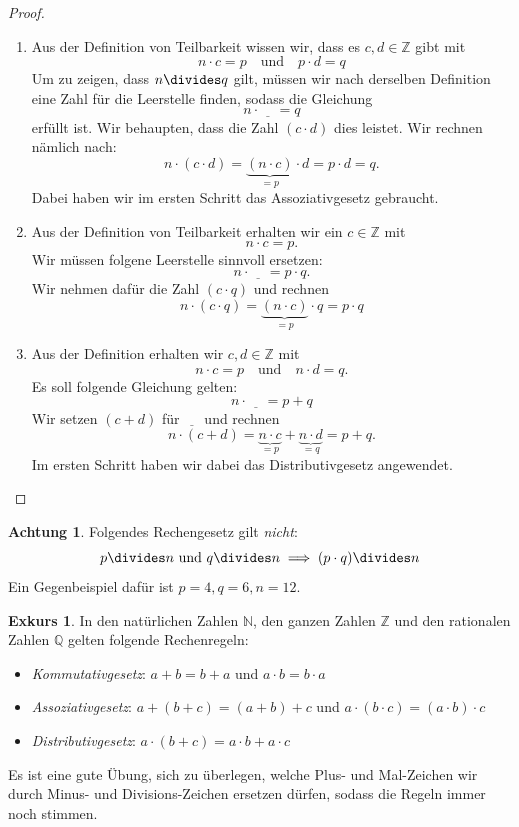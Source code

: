 \documentclass[a4paper,ngerman,12pt]{scrartcl}
\newcommand{\N}{\mathbb{N}}
\newcommand{\Z}{\mathbb{Z}}
\newcommand{\Q}{\mathbb{Q}}
\newcommand{\leer}{\underline{\;\;\;\;}}
\theoremstyle{definition}
\newtheorem*{exk}{Exkurs}
\newtheorem*{acht}{Achtung}
\newenvironment{exkurs}{\begin{shaded}\begin{exk}}{\end{exk}\end{shaded}}
\newenvironment{beweisliste}{\begin{enumerate}[Zu (i):]}{\end{enumerate}}
\begin{document}
\begin{proof}
  \begin{beweisliste}
    \item Aus der Definition von Teilbarkeit wissen wir, dass es $c, d \in \Z$ gibt mit
    \[ n \cdot c = p \quad \text{und} \quad p \cdot d = q \]
    Um zu zeigen, dass $n \divides q$ gilt, müssen wir nach derselben Definition eine Zahl für die Leerstelle finden, sodass die Gleichung
    \[ n \cdot \leer = q \]
    erfüllt ist. Wir behaupten, dass die Zahl $(c \cdot d)$ dies leistet. Wir rechnen nämlich nach:
    \[ n \cdot (c \cdot d) = \underbrace{(n \cdot c)}_{= p} \cdot d = p \cdot d = q. \]
    Dabei haben wir im ersten Schritt das Assoziativgesetz gebraucht.
    \item Aus der Definition von Teilbarkeit erhalten wir ein $c \in \Z$ mit
    \[ n \cdot c = p. \]
    Wir müssen folgene Leerstelle sinnvoll ersetzen:
    \[ n \cdot \leer = p \cdot q. \]
    Wir nehmen dafür die Zahl $(c \cdot q)$ und rechnen
    \[ n \cdot (c \cdot q) = \underbrace{(n \cdot c)}_{= p} \cdot q = p \cdot q \]
    \item Aus der Definition erhalten wir $c, d \in \Z$ mit
    \[ n \cdot c = p \quad \text{und} \quad n \cdot d = q. \]
    Es soll folgende Gleichung gelten:
    \[ n \cdot \leer = p + q \]
    Wir setzen $(c+d)$ für $\leer$ und rechnen
    \[ n \cdot (c+d) = \underbrace{n \cdot c}_{= p} + \underbrace{n \cdot d}_{= q} = p + q. \]
    Im ersten Schritt haben wir dabei das Distributivgesetz angewendet.
  \end{beweisliste}
\end{proof}

\begin{acht}
  Folgendes Rechengesetz gilt \emph{nicht}:
  \[ p \divides n \text{ und } q \divides n \implies (p \cdot q) \divides n \]
  Ein Gegenbeispiel dafür ist $p = 4, q = 6, n = 12$.
\end{acht}

\begin{exkurs}
  In den natürlichen Zahlen $\N$, den ganzen Zahlen $\Z$ und den rationalen Zahlen $\Q$ gelten folgende Rechenregeln:
  \begin{itemize}
    \item \emph{Kommutativgesetz}: $a + b = b + a$ und $a \cdot b = b \cdot a$
    \item \emph{Assoziativgesetz}: $a + (b + c) = (a + b) + c$ und $a \cdot (b \cdot c) = (a \cdot b) \cdot c$
    \item \emph{Distributivgesetz}: $a \cdot (b + c) = a \cdot b + a \cdot c$
  \end{itemize}
  Es ist eine gute Übung, sich zu überlegen, welche Plus- und Mal-Zeichen wir durch Minus- und Divisions-Zeichen ersetzen dürfen, sodass die Regeln immer noch stimmen.
\end{exkurs}
\end{document}
